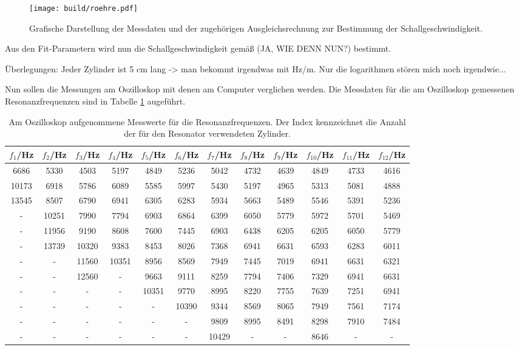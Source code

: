 \begin{figure}
  \centering
  \texttt{[image: build/roehre.pdf]}
  \caption{Grafische Darstellung der Messdaten und der zugehörigen Ausgleichsrechnung
  zur Bestimmung der Schallgeschwindigkeit.}
  \label{fig:roehre}
\end{figure}

Aus den Fit-Parametern wird nun die Schallgeschwindigkeit gemäß (JA, WIE DENN NUN?)
bestimmt.

Überlegungen: Jeder Zylinder ist 5 cm lang -> man bekommt irgendwas mit Hz/m. Nur
die logarithmen stören mich noch irgendwie...


Nun sollen die Messungen am Oszilloskop mit denen am Computer verglichen werden.
Die Messdaten für die am Oszilloskop gemessenen Resonanzfrequenzen sind in Tabelle
\ref{tab:oszi} augeführt.

\begin{table}[htp]
	\begin{center}
    \caption{Am Oszilloskop aufgenommene Messwerte für die Resonanzfrequenzen. Der
    Index kennzeichnet die Anzahl der für den Resonator verwendeten Zylinder.}
    \label{tab:oszi}
    \tiny
		\begin{tabular}{cccccccccccc}
		\toprule
			{$f_1$/Hz} & {$f_2$/Hz} & {$f_3$/Hz} & {$f_4$/Hz} & {$f_5$/Hz} & {$f_6$/Hz} & {$f_7$/Hz} & {$f_8$/Hz} & {$f_9$/Hz} & {$f_{10}$/Hz} & {$f_{11}$/Hz} & {$f_{12}$/Hz}\\
			\midrule
			6686 & 5330 & 4503 & 5197 & 4849 & 5236 & 5042 & 4732 & 4639 & 4849 & 4733 & 4616\\
			10173 & 6918 & 5786 & 6089 & 5585 & 5997 & 5430 & 5197 & 4965 & 5313 & 5081 & 4888\\
			13545 & 8507 & 6790 & 6941 & 6305 & 6283 & 5934 & 5663 & 5489 & 5546 & 5391 & 5236\\
			{-} & 10251 & 7990 & 7794 & 6903 & 6864 & 6399 & 6050 & 5779 & 5972 & 5701 & 5469\\
			{-} & 11956 & 9190 & 8608 & 7600 & 7445 & 6903 & 6438 & 6205 & 6205 & 6050 & 5779\\
			{-} & 13739 & 10320 & 9383 & 8453 & 8026 & 7368 & 6941 & 6631 & 6593 & 6283 & 6011\\
			{-} & {-} & 11560 & 10351 & 8956 & 8569 & 7949 & 7445 & 7019 & 6941 & 6631 & 6321\\
			{-} & {-} & 12560 & {-} & 9663 & 9111 & 8259 & 7794 & 7406 & 7329 & 6941 & 6631\\
			{-} & {-} & {-} & {-} & 10351 & 9770 & 8995 & 8220 & 7755 & 7639 & 7251 & 6941\\
			{-} & {-} & {-} & {-} & {-} & 10390 & 9344 & 8569 & 8065 & 7949 & 7561 & 7174\\
			{-} & {-} & {-} & {-} & {-} & {-} & 9809 & 8995 & 8491 & 8298 & 7910 & 7484\\
			{-} & {-} & {-} & {-} & {-} & {-} & 10429 & {-} & {-} & 8646 & {-} & {-}\\
		\bottomrule
		\end{tabular}
	\end{center}
\end{table}

